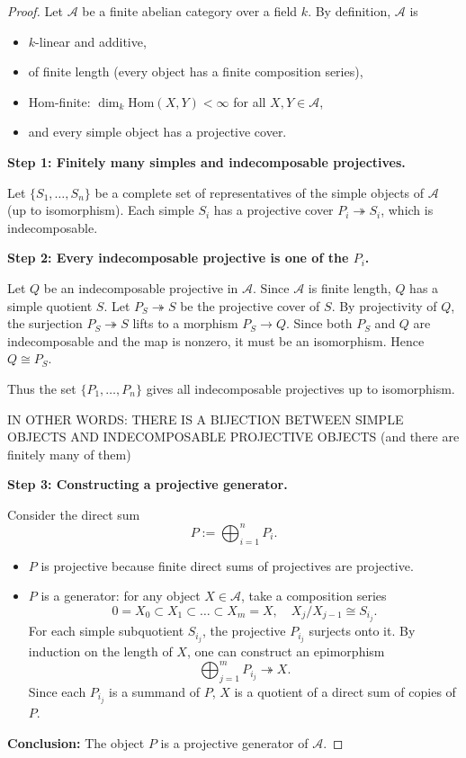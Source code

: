\documentclass[11pt]{article}
\theoremstyle{definition}
\begin{document}
\begin{proof}
Let $\mathcal A$ be a finite abelian category over a field $k$. By definition, $\mathcal A$ is
\begin{itemize}
    \item $k$-linear and additive,
    \item of finite length (every object has a finite composition series),
    \item Hom-finite: $\dim_k \mathrm{Hom}(X,Y) < \infty$ for all $X,Y \in \mathcal A$,
    \item and every simple object has a projective cover.
\end{itemize}

\textbf{Step 1: Finitely many simples and indecomposable projectives.}

Let $\{S_1, \dots, S_n\}$ be a complete set of representatives of the simple objects of $\mathcal A$ (up to isomorphism). Each simple $S_i$ has a projective cover $P_i \twoheadrightarrow S_i$, which is indecomposable. 

\textbf{Step 2: Every indecomposable projective is one of the $P_i$.}

Let $Q$ be an indecomposable projective in $\mathcal A$. Since $\mathcal A$ is finite length, $Q$ has a simple quotient $S$. Let $P_S \twoheadrightarrow S$ be the projective cover of $S$. By projectivity of $Q$, the surjection $P_S \twoheadrightarrow S$ lifts to a morphism $P_S \to Q$. Since both $P_S$ and $Q$ are indecomposable and the map is nonzero, it must be an isomorphism. Hence $Q \cong P_S$. 

Thus the set $\{P_1, \dots, P_n\}$ gives all indecomposable projectives up to isomorphism.

IN OTHER WORDS: THERE IS A BIJECTION BETWEEN SIMPLE OBJECTS AND INDECOMPOSABLE PROJECTIVE OBJECTS (and there are finitely many of them)

\textbf{Step 3: Constructing a projective generator.}

Consider the direct sum
\[
P := \bigoplus_{i=1}^n P_i.
\]

\begin{itemize}
    \item $P$ is projective because finite direct sums of projectives are projective.
    \item $P$ is a generator: for any object $X \in \mathcal A$, take a composition series
    \[
    0 = X_0 \subset X_1 \subset \dots \subset X_m = X, \quad X_j/X_{j-1} \cong S_{i_j}.
    \]
    For each simple subquotient $S_{i_j}$, the projective $P_{i_j}$ surjects onto it. By induction on the length of $X$, one can construct an epimorphism
    \[
    \bigoplus_{j=1}^m P_{i_j} \twoheadrightarrow X.
    \]
    Since each $P_{i_j}$ is a summand of $P$, $X$ is a quotient of a direct sum of copies of $P$.
\end{itemize}

\textbf{Conclusion:} The object $P$ is a projective generator of $\mathcal A$.
\end{proof}
\end{document}
